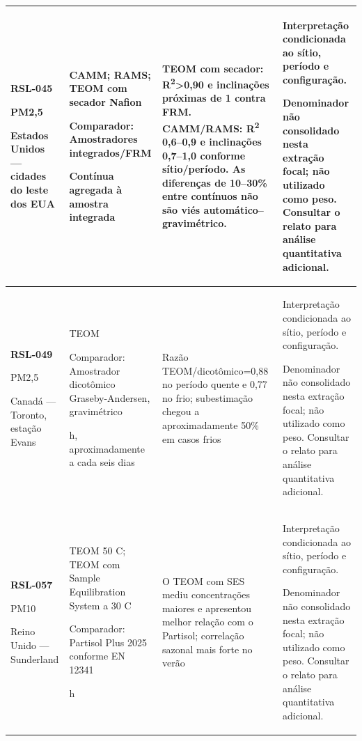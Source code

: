 \begin{longtable}{|P{0.18\textwidth}|P{0.25\textwidth}|P{0.28\textwidth}|P{\arrayrulewidth\relax}|}
\textbf{RSL-045}\par\textcite{rsl045}\par PM2,5\par Estados Unidos --- cidades do leste dos EUA & CAMM; RAMS; TEOM com secador Nafion\par\medskip Comparador: Amostradores integrados/FRM\par\medskip Contínua agregada à amostra integrada & TEOM com secador: R\textsuperscript{2}>0,90 e inclinações próximas de 1 contra FRM. CAMM/RAMS: R\textsuperscript{2} 0,6--0,9 e inclinações 0,7--1,0 conforme sítio/período. As diferenças de 10--30\% entre contínuos não são viés automático--gravimétrico. & Interpretação condicionada ao sítio, período e configuração.\par\medskip Denominador não consolidado nesta extração focal; não utilizado como peso. Consultar o relato para análise quantitativa adicional.\\\hline
\textbf{RSL-049}\par\textcite{rsl049}\par PM2,5\par Canadá --- Toronto, estação Evans & TEOM\par\medskip Comparador: Amostrador dicotômico Graseby-Andersen, gravimétrico\par{} h, aproximadamente a cada seis dias & Razão TEOM/dicotômico=0,88 no período quente e 0,77 no frio; subestimação chegou a aproximadamente 50\% em casos frios & Interpretação condicionada ao sítio, período e configuração.\par\medskip Denominador não consolidado nesta extração focal; não utilizado como peso. Consultar o relato para análise quantitativa adicional.\\\hline
\textbf{RSL-057}\par\textcite{rsl057}\par PM10\par Reino Unido --- Sunderland & TEOM 50 \textdegree{}C; TEOM com Sample Equilibration System a 30 \textdegree{}C\par\medskip Comparador: Partisol Plus 2025 conforme EN 12341\par{} h & O TEOM com SES mediu concentrações maiores e apresentou melhor relação com o Partisol; correlação sazonal mais forte no verão & Interpretação condicionada ao sítio, período e configuração.\par\medskip Denominador não consolidado nesta extração focal; não utilizado como peso. Consultar o relato para análise quantitativa adicional.\\\hline

\end{longtable}
